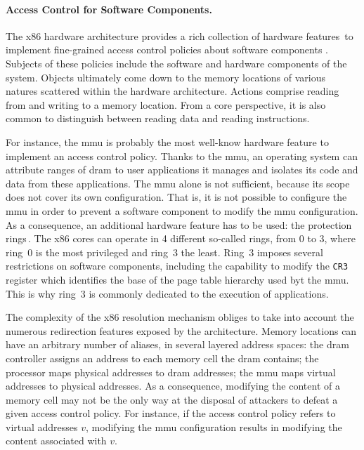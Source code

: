 \paragraph{Access Control for Software Components.}
%
The x86 hardware architecture provides a rich collection of hardware
features\,\cite[Volume 3]{intel2014manual} to implement fine-grained access
control policies about software components \IOs.
%
Subjects of these policies include the software and hardware components of the
system.
%
Objects ultimately come down to the memory locations of various natures
scattered within the hardware architecture.
%
Actions comprise reading from and writing to a memory location. From a core
perspective, it is also common to distinguish between reading data and reading
instructions.

For instance, the \ac{mmu} is probably the most well-know hardware feature to
implement an access control policy.
%
Thanks to the \ac{mmu}, an operating system can attribute ranges of \ac{dram} to
user applications it manages and isolates its code and data from these
applications.
%
The \ac{mmu} alone is not sufficient, because its scope does not cover its own
configuration.
%
That is, it is not possible to configure the \ac{mmu} in order to prevent a
software component to modify the \ac{mmu} configuration.
%
As a consequence, an additional hardware feature has to be used: the protection
rings\,\cite[Volume 3, Section 5.5]{intel2014manual}.
%
The x86 cores can operate in 4 different so-called rings, from 0 to 3, where
ring~0 is the most privileged and ring~3 the least.
%
Ring~3 imposes several restrictions on software components, including the
capability to modify the \texttt{CR3} register which identifies the base of the
page table hierarchy used byt the \ac{mmu}.
%
This is why ring~3 is commonly dedicated to the execution of applications.

%
%

The complexity of the x86 \IO resolution mechanism obliges to take into account
the numerous redirection features exposed by the architecture.
%
Memory locations can have an arbitrary number of aliases, in several layered
address spaces: the \ac{dram} controller assigns an address to each memory cell
the \ac{dram} contains; the processor maps physical addresses to \ac{dram}
addresses; the \ac{mmu} maps virtual addresses to physical addresses.
%
As a consequence, modifying the content of a memory cell may not be the only way
at the disposal of attackers to defeat a given access control policy.
%
For instance, if the access control policy refers to virtual addresses \( v \),
modifying the \ac{mmu} configuration results in modifying the content associated
with \( v \).

